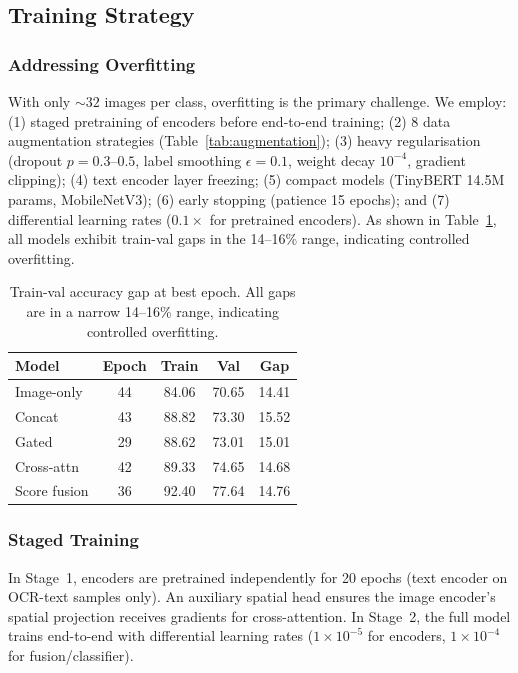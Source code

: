 \documentclass[10pt,twocolumn]{article}
\begin{document}
\subsection{Training Strategy}

\subsubsection{Addressing Overfitting}

With only ${\sim}32$ images per class, overfitting is the primary challenge. We employ: (1) staged pretraining of encoders before end-to-end training; (2) 8 data augmentation strategies (Table~\ref{tab:augmentation}); (3) heavy regularisation (dropout $p = 0.3$--$0.5$, label smoothing $\epsilon = 0.1$, weight decay $10^{-4}$, gradient clipping); (4) text encoder layer freezing; (5) compact models (TinyBERT 14.5M params, MobileNetV3); (6) early stopping (patience 15 epochs); and (7) differential learning rates ($0.1\times$ for pretrained encoders). As shown in Table~\ref{tab:overfitting}, all models exhibit train-val gaps in the 14--16\% range, indicating controlled overfitting.

\begin{table}[t]
\centering
\caption{Train-val accuracy gap at best epoch. All gaps are in a narrow 14--16\% range, indicating controlled overfitting.}
\label{tab:overfitting}
\small
\begin{tabular}{@{}lcccc@{}}
\toprule
\textbf{Model} & \textbf{Epoch} & \textbf{Train} & \textbf{Val} & \textbf{Gap} \\
\midrule
Image-only   & 44 & 84.06 & 70.65 & 14.41 \\
Concat       & 43 & 88.82 & 73.30 & 15.52 \\
Gated        & 29 & 88.62 & 73.01 & 15.01 \\
Cross-attn   & 42 & 89.33 & 74.65 & 14.68 \\
Score fusion & 36 & 92.40 & 77.64 & 14.76 \\
\bottomrule
\end{tabular}
\end{table}

\subsubsection{Staged Training}

In Stage~1, encoders are pretrained independently for 20 epochs (text encoder on OCR-text samples only). An auxiliary spatial head ensures the image encoder's spatial projection receives gradients for cross-attention. In Stage~2, the full model trains end-to-end with differential learning rates ($1 \times 10^{-5}$ for encoders, $1 \times 10^{-4}$ for fusion/classifier).
\end{document}

